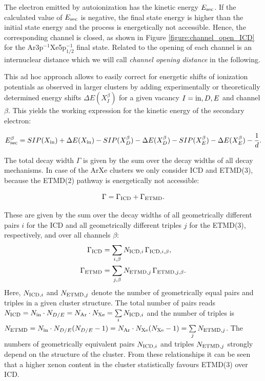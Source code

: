 The electron emitted by autoionization has the kinetic energy $E_{\rm sec}$. 
If the calculated value of $E_{\rm sec}$ is negative,
the final state energy is higher than the initial state energy and the        
process is energetically not accessible. Hence, the corresponding channel     
is closed, as shown in Figure \ref{figure:channel_open_ICD} for the
Ar3p$^{-1}$Xe5p$_{1/2}^{-1}$ final state. Related to
the opening of each channel is an internuclear distance which we will call 
\emph{channel opening distance} in the following.
                                                               
This {\latin ad hoc} approach allows to easily correct for energetic shifts of ionization potentials as observed in larger clusters by adding experimentally or theoretically determined energy shifts $\Delta E(X_{I}^{\beta})$ for a given vacancy $I={\rm in},D,E$ and channel $\beta$. This yields the working expression for the kinetic energy of the secondary electron:

\begin{equation}
 E_{\rm sec}^\beta = SIP(X_{\rm in}) + \Delta E (X_{\rm in})
               - SIP(X_{D}^\beta) - \Delta E (X_{D}^\beta)
               - SIP(X_{E}^\beta) - \Delta E (X_{E}^\beta)
               - \frac 1d .
\end{equation}

The total decay width $\Gamma$ is given by the sum over the decay widths
of all decay mechanisms. In case of the ArXe clusters we only consider
ICD and ETMD(3), because the ETMD(2) pathway is energetically not accessible:

\begin{equation}
 \Gamma = \Gamma_{\rm ICD} + \Gamma_{\rm ETMD} .
\end{equation}

These are given by the sum over the decay widths of all 
geometrically different pairs $i$ for the
ICD and all geometrically different triples $j$ for the ETMD(3),
respectively, and over all channels $\beta$:
%
\begin{align}
 \Gamma_{\rm ICD}  &= \sum\limits_{i,\beta} N_{{\rm ICD},i}  \, \Gamma_{{\rm ICD},i,\beta},\\
 \Gamma_{\rm ETMD} &= \sum\limits_{j,\beta} N_{{\rm ETMD},j} \, \Gamma_{{\rm ETMD},j,\beta}.
\end{align}
Here, $N_{{\rm ICD},i}$ and $N_{{\rm ETMD},j}$ denote the number of geometrically
equal pairs and triples in a given cluster structure. The total number of pairs
reads
$N_{{\rm ICD}} = N_{\rm in} \cdot N_{D/E} = N_{\rm Ar} \cdot N_{\rm Xe}
 = \sum\limits_i N_{{\rm ICD},i}$ and the number of triples is
$N_{{\rm ETMD}} = N_{\rm in} \cdot N_{D/E} (N_{D/E} - 1) = N_{\rm Ar} \cdot N_{\rm Xe} (N_{\rm Xe} - 1)
 = \sum\limits_j N_{{\rm ETMD},j}$.
The numbers of geometrically equivalent pairs $N_{{\rm ICD},i}$ and triples $N_{{\rm ETMD},j}$
strongly depend on the structure of the cluster. From these relationships
it can be seen that a higher xenon content in the cluster statistically
favours ETMD(3) over ICD.

